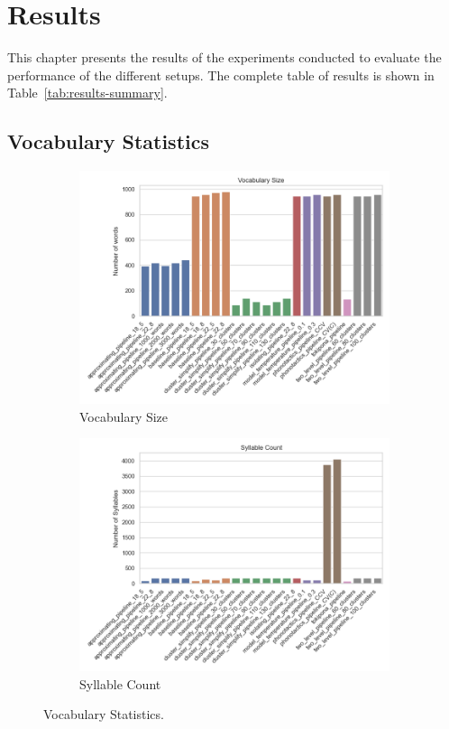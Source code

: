 \chapter{Results}\label{chapter:results}

This chapter presents the results of the experiments conducted to evaluate the performance of the different setups. The complete table of 
results is shown in Table~\ref{tab:results-summary}.

\section{Vocabulary Statistics}
\begin{figure}[H]
    \centering
    \begin{subfigure}[b]{0.48\linewidth}
        \includegraphics[width=\linewidth]{figures/results/vocabulary_size.png}
        \caption{Vocabulary Size}
        \label{fig:vocabulary-size}
    \end{subfigure}
    \hfill
    \begin{subfigure}[b]{0.48\textwidth}
        \includegraphics[width=\linewidth]{figures/results/syllable_count.png}
        \caption{Syllable Count}
        \label{fig:syllable-count}
    \end{subfigure}
    \caption{Vocabulary Statistics.}
    \label{fig:vocabulary-statistics}
\end{figure}

